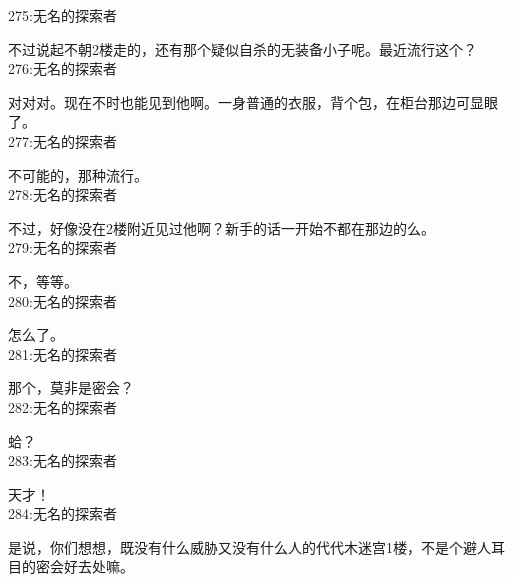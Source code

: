 275:无名的探索者

不过说起不朝2楼走的，还有那个疑似自杀的无装备小子呢。最近流行这个？\\

276:无名的探索者

对对对。现在不时也能见到他啊。一身普通的衣服，背个包，在柜台那边可显眼了。\\

277:无名的探索者

不可能的，那种流行。\\

278:无名的探索者

不过，好像没在2楼附近见过他啊？新手的话一开始不都在那边的么。\\

279:无名的探索者

不，等等。\\

280:无名的探索者

怎么了。\\

281:无名的探索者

那个，莫非是密会？\\

282:无名的探索者

蛤？\\

283:无名的探索者

天才！\\

284:无名的探索者

是说，你们想想，既没有什么威胁又没有什么人的代代木迷宫1楼，不是个避人耳目的密会好去处嘛。

